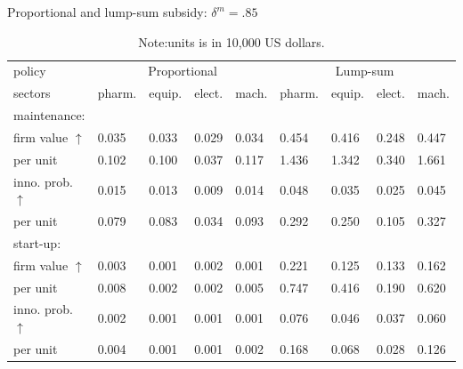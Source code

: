 \documentclass[11pt]{article}
\begin{document}
\clearpage 
\begin{table}[h!]
\caption{Proportional and lump-sum subsidy: $\delta^m=.85$}
\centering
\small{
\label{TC}
\begin{tabular}{lllllllll}
\toprule
policy             & \multicolumn{4}{c}{Proportional}                     & \multicolumn{4}{c}{Lump-sum}                         \\\cmidrule{2-9}
sectors                      & pharm. & equip. & elect. & mach. & pharm. & equip. & elect. & mach. \\
\hline 
maintenance:           &        &        &        &        &        &        &        &   \\
firm value $\uparrow$       &0.035 & 0.033 & 0.029 & 0.034 & 0.454 & 0.416 & 0.248 & 0.447 \\
per unit                &0.102 & 0.100 & 0.037 & 0.117 & 1.436 & 1.342 & 0.340 & 1.661 \\
inno. prob.$\uparrow$   &0.015 & 0.013 & 0.009 & 0.014 & 0.048 & 0.035 & 0.025 & 0.045 \\
per unit              &0.079 & 0.083 & 0.034 & 0.093 & 0.292 & 0.250 & 0.105 & 0.327 \\
\hline
start-up:               &        &        &        &        &        &        &        &        \\
firm value $\uparrow$         &0.003 & 0.001 & 0.002 & 0.001 & 0.221 & 0.125 & 0.133 & 0.162 \\
per unit            & 0.008 & 0.002 & 0.002 & 0.005 & 0.747 & 0.416 & 0.190 & 0.620 \\
inno. prob. $\uparrow$   &0.002 & 0.001 & 0.001 & 0.001 & 0.076 & 0.046 & 0.037 & 0.060 \\
per unit             &0.004 & 0.001 & 0.001 & 0.002 & 0.168 & 0.068 & 0.028 & 0.126 \\ \bottomrule
\end{tabular}
}
\caption*{\footnotesize {}Note:units is in 10,000 US dollars.}{\small \par}
\end{table}
\end{document}
